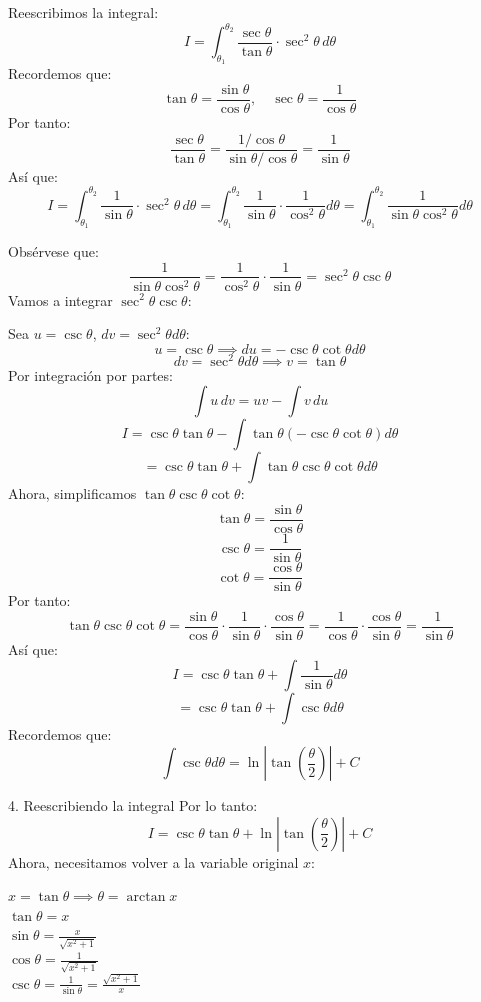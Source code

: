 \documentclass{article}
\theoremstyle{nonumberplain}
\begin{document}
Reescribimos la integral:
\[
I = \int_{\theta_1}^{\theta_2} \frac{\sec\theta}{\tan\theta} \cdot \sec^2\theta\, d\theta
\]
Recordemos que:
\[
\tan\theta = \frac{\sin\theta}{\cos\theta}, \quad \sec\theta = \frac{1}{\cos\theta}
\]
Por tanto:
\[
\frac{\sec\theta}{\tan\theta} = \frac{1/\cos\theta}{\sin\theta/\cos\theta} = \frac{1}{\sin\theta}
\]
Así que:
\[
I = \int_{\theta_1}^{\theta_2} \frac{1}{\sin\theta} \cdot \sec^2\theta\, d\theta = \int_{\theta_1}^{\theta_2} \frac{1}{\sin\theta} \cdot \frac{1}{\cos^2\theta} d\theta = \int_{\theta_1}^{\theta_2} \frac{1}{\sin\theta\cos^2\theta} d\theta
\]

Obsérvese que:
\[
\frac{1}{\sin\theta \cos^2\theta} = \frac{1}{\cos^2\theta} \cdot \frac{1}{\sin\theta} = \sec^2\theta \csc\theta
\]
Vamos a integrar \(\sec^2\theta \csc\theta\):

Sea \(u = \csc\theta\), \(dv = \sec^2\theta d\theta\):
\[
u = \csc\theta \implies du = -\csc\theta \cot\theta d\theta
\]
\[
dv = \sec^2\theta d\theta \implies v = \tan\theta
\]
Por integración por partes:
\[
\int u\, dv = uv - \int v\, du
\]
\[
I = \csc\theta \tan\theta - \int \tan\theta \left(-\csc\theta \cot\theta\right) d\theta
\]
\[
= \csc\theta \tan\theta + \int \tan\theta \csc\theta \cot\theta d\theta
\]
Ahora, simplificamos \(\tan\theta \csc\theta \cot\theta\):
\[
\tan\theta = \frac{\sin\theta}{\cos\theta}
\]
\[
\csc\theta = \frac{1}{\sin\theta}
\]
\[
\cot\theta = \frac{\cos\theta}{\sin\theta}
\]
Por tanto:
\[
\tan\theta \csc\theta \cot\theta = \frac{\sin\theta}{\cos\theta} \cdot \frac{1}{\sin\theta} \cdot \frac{\cos\theta}{\sin\theta} = \frac{1}{\cos\theta} \cdot \frac{\cos\theta}{\sin\theta} = \frac{1}{\sin\theta}
\]
Así que:
\[
I = \csc\theta \tan\theta + \int \frac{1}{\sin\theta} d\theta
\]
\[
= \csc\theta \tan\theta + \int \csc\theta d\theta
\]
Recordemos que:
\[
\int \csc\theta d\theta = \ln \left| \tan\left(\frac{\theta}{2}\right) \right| + C
\]

4. Reescribiendo la integral
Por lo tanto:
\[
I = \csc\theta \tan\theta + \ln \left| \tan\left(\frac{\theta}{2}\right) \right| + C
\]
Ahora, necesitamos volver a la variable original \(x\):

\(x = \tan\theta \implies \theta = \arctan x\)\\
\(\tan\theta = x\)\\
\(\sin\theta = \frac{x}{\sqrt{x^2 + 1}}\)\\
\(\cos\theta = \frac{1}{\sqrt{x^2 + 1}}\)\\
\(\csc\theta = \frac{1}{\sin\theta} = \frac{\sqrt{x^2 + 1}}{x}\)\\
\end{document}
